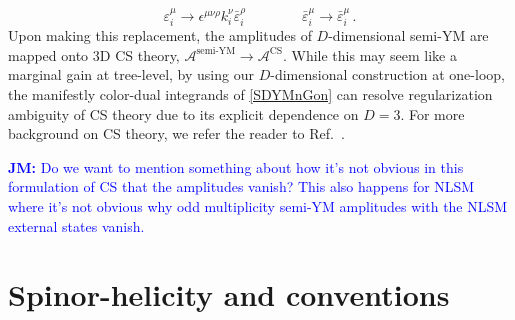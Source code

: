 \documentclass[11pt,letter]{article}
\newcommand{\jm}[1]{\textcolor{blue}{\textbf{JM: }{#1}}}
\def\be{\begin{equation}}
\def\ee{\end{equation}}
\begin{document}
\be
\varepsilon^\mu_i \rightarrow \epsilon^{\mu\nu\rho} k^\nu_i \bar{\varepsilon}^\rho_i \qquad\qquad  \bar{\varepsilon}_i^\mu \rightarrow \bar{\varepsilon}^\mu_i \, .
\ee
Upon making this replacement, the amplitudes of $D$-dimensional semi-YM are mapped onto 3D CS theory, $\mathcal{A}^{\text{semi-YM}}\rightarrow \mathcal{A}^{\text{CS}}$. While this may seem like a marginal gain at tree-level, by using our $D$-dimensional construction at one-loop, the manifestly color-dual integrands of \cref{SDYMnGon} can resolve regularization ambiguity of CS theory due to its explicit dependence on $D=3$. For more background on CS theory, we refer the reader to Ref.~\cite{Ben-Shahar:2021zww}.

\jm{Do we want to mention something about how it's not obvious in this formulation of CS that the amplitudes vanish?  This also happens for NLSM where it's not obvious why odd multiplicity semi-YM amplitudes with the NLSM external states vanish.}

\section{Spinor-helicity and conventions}\label{Conventions}
\end{document}
